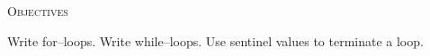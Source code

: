 
\textsc{Objectives}
 \begin{myenum}
   \li Write for--loops.
   \li Write while--loops.
   \li Use sentinel values to terminate a loop.
 \end{myenum}
